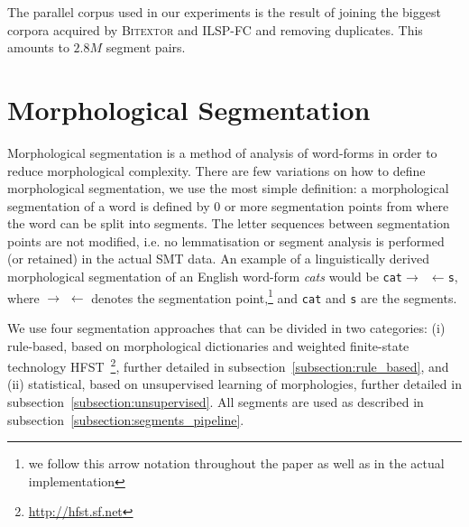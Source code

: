 \documentclass[postprint]{flammie}
\begin{document}
The parallel corpus used in our experiments is the result of joining the biggest corpora acquired by \textsc{Bitextor} and \textsc{ILSP-FC} and removing duplicates.
This amounts to $2.8M$ %
segment pairs.



%
\section{Morphological Segmentation}
\label{section:morphological_segmentation}

Morphological segmentation is a method of analysis of word-forms in order to reduce morphological complexity. There are few variations on how to define morphological segmentation, we use the most simple definition: a morphological segmentation of a word is defined by 0 or more segmentation points from where the word can be split into segments. The letter sequences between segmentation points are not modified, i.e. no lemmatisation or segment analysis is performed (or retained) in the actual SMT data.
An example of a linguistically derived morphological segmentation of an English word-form \textit{cats} would be \texttt{cat$\rightarrow$ $\leftarrow$s}, where $\rightarrow$ $\leftarrow$ denotes the segmentation point,\footnote{we follow this arrow notation throughout the paper as well as in the actual implementation} and \texttt{cat} and \texttt{s} are the segments.


We use four segmentation approaches that can be divided in two categories: (i) rule-based, based on morphological dictionaries and weighted finite-state technology \textsc{HFST}~\cite{hfst}\footnote{\url{http://hfst.sf.net}}, further detailed in subsection~\ref{subsection:rule_based}, and (ii) statistical, based on unsupervised learning of morphologies, %
further detailed in subsection~\ref{subsection:unsupervised}. All segments are used as described in subsection~\ref{subsection:segments_pipeline}.
\end{document}
